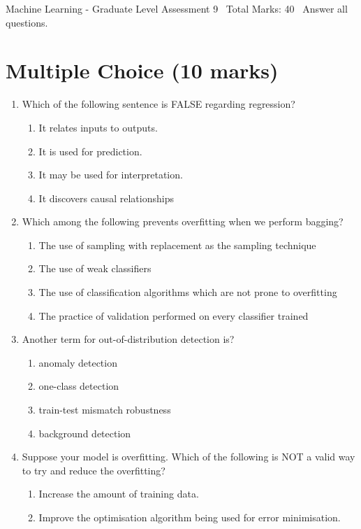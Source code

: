 \documentclass[12pt]{article}
\begin{document}
\begin{center}
Machine Learning - Graduate Level Assessment 9 \
Total Marks: 40 \
Answer all questions.
\end{center}

\section*{Multiple Choice (10 marks)}
\begin{enumerate}[label=\arabic*.]
\item Which of the following sentence is FALSE regarding regression?
\begin{enumerate}[label=(\alph*)]
    \item It relates inputs to outputs.
    \item It is used for prediction.
    \item It may be used for interpretation.
    \item It discovers causal relationships
\end{enumerate}
\item Which among the following prevents overfitting when we perform bagging?
\begin{enumerate}[label=(\alph*)]
    \item The use of sampling with replacement as the sampling technique
    \item The use of weak classifiers
    \item The use of classification algorithms which are not prone to overfitting
    \item The practice of validation performed on every classifier trained
\end{enumerate}
\item Another term for out-of-distribution detection is?
\begin{enumerate}[label=(\alph*)]
    \item anomaly detection
    \item one-class detection
    \item train-test mismatch robustness
    \item background detection
\end{enumerate}
\item Suppose your model is overfitting. Which of the following is NOT a valid way to try and reduce the overfitting?
\begin{enumerate}[label=(\alph*)]
    \item Increase the amount of training data.
    \item Improve the optimisation algorithm being used for error minimisation.

\end{enumerate}
\end{enumerate}
\end{document}
